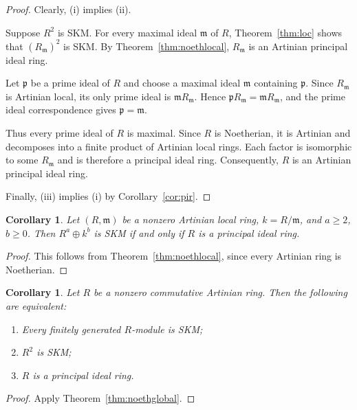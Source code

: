 \documentclass[11pt,a4paper]{article}
\newtheorem{corollary}[theorem]{Corollary}
\theoremstyle{definition}
\theoremstyle{remark}
\begin{document}
\begin{proof}
Clearly, (i) implies (ii).

Suppose $R^2$ is SKM. For every maximal ideal $\mathfrak m$ of $R$, Theorem~\ref{thm:loc} shows that $(R_{\mathfrak m})^2$ is SKM. By Theorem~\ref{thm:noethlocal}, $R_{\mathfrak m}$ is an Artinian principal ideal ring.

Let $\mathfrak p$ be a prime ideal of $R$ and choose a maximal ideal $\mathfrak m$ containing $\mathfrak p$. Since $R_{\mathfrak m}$ is Artinian local, its only prime ideal is $\mathfrak mR_{\mathfrak m}$. Hence $\mathfrak pR_{\mathfrak m}=\mathfrak mR_{\mathfrak m}$, and the prime ideal correspondence gives $\mathfrak p=\mathfrak m$.

Thus every prime ideal of $R$ is maximal. Since $R$ is Noetherian, it is Artinian and decomposes into a finite product of Artinian local rings. Each factor is isomorphic to some $R_{\mathfrak m}$ and is therefore a principal ideal ring. Consequently, $R$ is an Artinian principal ideal ring.

Finally, (iii) implies (i) by Corollary~\ref{cor:pir}.
\end{proof}

\begin{corollary}
\label{thm:artlocal}
Let $(R,\mathfrak m)$ be a nonzero Artinian local ring, $k=R/\mathfrak m$, and $a\geq2$, $b\geq0$. Then $R^a\oplus k^b$ is SKM if and only if $R$ is a principal ideal ring.
\end{corollary}

\begin{proof}
This follows from Theorem~\ref{thm:noethlocal}, since every Artinian ring is Noetherian.
\end{proof}

\begin{corollary}
\label{thm:artglobal}
Let $R$ be a nonzero commutative Artinian ring. Then the following are equivalent:
\begin{enumerate}[label=\textup{(\roman*)}]
\item Every finitely generated $R$-module is SKM;
\item $R^2$ is SKM;
\item $R$ is a principal ideal ring.
\end{enumerate}
\end{corollary}

\begin{proof}
Apply Theorem~\ref{thm:noethglobal}.
\end{proof}
\end{document}
